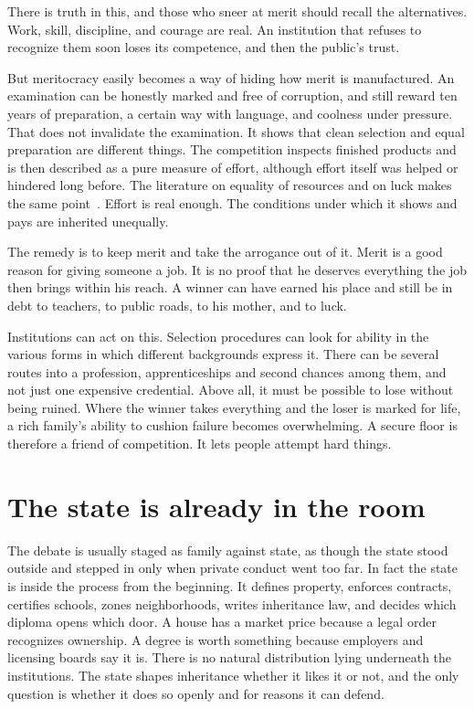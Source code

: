 \documentclass[12pt,a4paper]{book}
\begin{document}
There is truth in this, and those who sneer at merit should recall the alternatives. Work, skill, discipline, and courage are real. An institution that refuses to recognize them soon loses its competence, and then the public's trust.

But meritocracy easily becomes a way of hiding how merit is manufactured. An examination can be honestly marked and free of corruption, and still reward ten years of preparation, a certain way with language, and coolness under pressure. That does not invalidate the examination. It shows that clean selection and equal preparation are different things. The competition inspects finished products and is then described as a pure measure of effort, although effort itself was helped or hindered long before. The literature on equality of resources and on luck makes the same point~\cite{Dworkin2000,Anderson1999}. Effort is real enough. The conditions under which it shows and pays are inherited unequally.

The remedy is to keep merit and take the arrogance out of it. Merit is a good reason for giving someone a job. It is no proof that he deserves everything the job then brings within his reach. A winner can have earned his place and still be in debt to teachers, to public roads, to his mother, and to luck.

Institutions can act on this. Selection procedures can look for ability in the various forms in which different backgrounds express it. There can be several routes into a profession, apprenticeships and second chances among them, and not just one expensive credential. Above all, it must be possible to lose without being ruined. Where the winner takes everything and the loser is marked for life, a rich family's ability to cushion failure becomes overwhelming. A secure floor is therefore a friend of competition. It lets people attempt hard things.

\section{The state is already in the room}

The debate is usually staged as family against state, as though the state stood outside and stepped in only when private conduct went too far. In fact the state is inside the process from the beginning. It defines property, enforces contracts, certifies schools, zones neighborhoods, writes inheritance law, and decides which diploma opens which door. A house has a market price because a legal order recognizes ownership. A degree is worth something because employers and licensing boards say it is. There is no natural distribution lying underneath the institutions. The state shapes inheritance whether it likes it or not, and the only question is whether it does so openly and for reasons it can defend.
\end{document}
